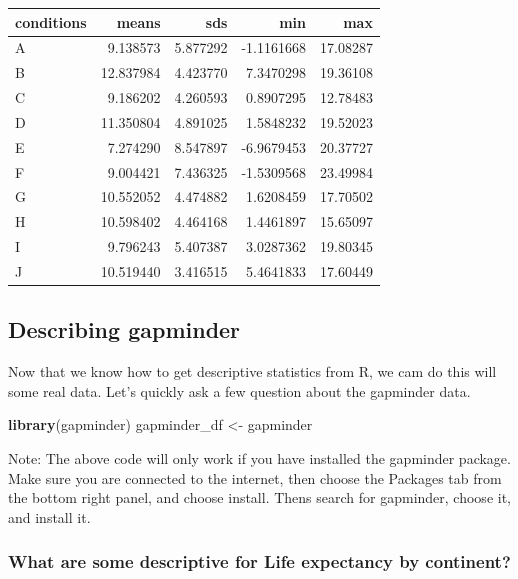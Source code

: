 \documentclass[]{book}
\newenvironment{Shaded}{\begin{snugshade}}{\end{snugshade}}
\newcommand{\KeywordTok}[1]{\textcolor[rgb]{0.13,0.29,0.53}{\textbf{#1}}}
\newcommand{\StringTok}[1]{\textcolor[rgb]{0.31,0.60,0.02}{#1}}
\newcommand{\NormalTok}[1]{#1}
\begin{document}
\begin{tabular}{l|r|r|r|r}
\hline
conditions & means & sds & min & max\\
\hline
A & 9.138573 & 5.877292 & -1.1161668 & 17.08287\\
\hline
B & 12.837984 & 4.423770 & 7.3470298 & 19.36108\\
\hline
C & 9.186202 & 4.260593 & 0.8907295 & 12.78483\\
\hline
D & 11.350804 & 4.891025 & 1.5848232 & 19.52023\\
\hline
E & 7.274290 & 8.547897 & -6.9679453 & 20.37727\\
\hline
F & 9.004421 & 7.436325 & -1.5309568 & 23.49984\\
\hline
G & 10.552052 & 4.474882 & 1.6208459 & 17.70502\\
\hline
H & 10.598402 & 4.464168 & 1.4461897 & 15.65097\\
\hline
I & 9.796243 & 5.407387 & 3.0287362 & 19.80345\\
\hline
J & 10.519440 & 3.416515 & 5.4641833 & 17.60449\\
\hline
\end{tabular}

\subsection{Describing gapminder}\label{describing-gapminder}

Now that we know how to get descriptive statistics from R, we cam do
this will some real data. Let's quickly ask a few question about the
gapminder data.

\begin{Shaded}
\begin{Highlighting}[]
\KeywordTok{library}\NormalTok{(gapminder)}
\NormalTok{gapminder_df <-}\StringTok{ }\NormalTok{gapminder}
\end{Highlighting}
\end{Shaded}

Note: The above code will only work if you have installed the gapminder
package. Make sure you are connected to the internet, then choose the
Packages tab from the bottom right panel, and choose install. Thens
search for gapminder, choose it, and install it.

\subsubsection{What are some descriptive for Life expectancy by
continent?}\label{what-are-some-descriptive-for-life-expectancy-by-continent}
\end{document}
